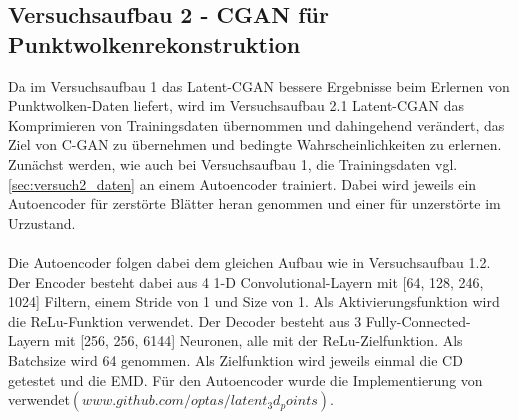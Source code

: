 \documentclass{llncs}
\begin{document}
\subsection{Versuchsaufbau 2 - CGAN für Punktwolkenrekonstruktion }\label{sec:versuch2-aufbau}

Da im Versuchsaufbau 1 das Latent-CGAN bessere Ergebnisse beim Erlernen von Punktwolken-Daten liefert, wird im Versuchsaufbau 2.1 Latent-CGAN das Komprimieren von Trainingsdaten übernommen und dahingehend verändert, das Ziel von C-GAN zu übernehmen und bedingte Wahrscheinlichkeiten zu erlernen. Zunächst werden, wie auch bei Versuchsaufbau 1, die Trainingsdaten vgl. \ref{sec:versuch2_daten} an einem Autoencoder trainiert. Dabei wird jeweils ein Autoencoder für zerstörte Blätter heran genommen und einer für unzerstörte im Urzustand.
\\\\
Die Autoencoder folgen dabei dem gleichen Aufbau wie in Versuchsaufbau 1.2. Der Encoder besteht dabei aus 4 1-D Convolutional-Layern mit [64, 128, 246, 1024] Filtern, einem Stride von 1 und Size von 1. Als Aktivierungsfunktion wird die ReLu-Funktion verwendet. Der Decoder besteht aus 3 Fully-Connected-Layern mit [256, 256, 6144] Neuronen, alle mit der ReLu-Zielfunktion. Als Batchsize wird 64 genommen. Als Zielfunktion wird jeweils einmal die CD getestet und die EMD. Für den Autoencoder wurde die Implementierung von \cite{3dgan} verwendet$(www.github.com/optas/latent_3d_points)$. 
\\\\
\end{document}
